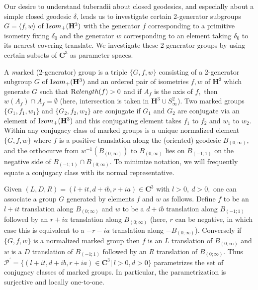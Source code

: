 
\begin{definition} \label{GMT 1.8}
Our desire to understand tuberadii about closed geodesics, and especially about a simple closed geodesic $\delta$, leads us to investigate certain 2-generator subgroups $G =
\langle f,w\rangle$  of ${\textrm Isom}_+(\mathbf {H}^3)$ with the generator $f$ corresponding to a primitive isometry fixing $\delta_0$ and the generator
$w$ corresponding to an element taking $\delta_0$ to its nearest covering translate.  We investigate these 2-generator groups by using certain
subsets of $\mathbf {C}^3$ as parameter spaces.

A {\textit marked {\textrm (2-}generator\/{\textrm )} group} is a triple $\{G,f,w\}$ consisting of a 2-generator subgroup $G$ of ${\textrm Isom}_+(\mathbf {H}^3)$
and an ordered pair of isometries $f,w$ of $\mathbf {H}^3$ which generate $G$  such that ${\textrm Relength}(f) > 0$ and if $A_f$ is the axis of $f,$ then $w(A_f)
\cap A_f  = \emptyset$  (here, intersection is taken in $\mathbf {H}^3 \cup S^2_\infty$). Two marked groups $\{G_1,f_1,w_1\}$ and $\{G_2,f_2,w_2\}$
are {\textit conjugate} if $G_1$ and $G_2$ are conjugate via an element of ${\textrm Isom}_+(\mathbf {H}^3)$ and this conjugating element takes $f_1$ to $f_2$
and
$w_1$ to $w_2.$  Within any conjugacy class of marked groups is a unique normalized element
$\{G,f,w\}$ where $f$ is a
positive translation  along the (oriented) geodesic $B_{(0;\infty)},$  and the
orthocurve from $w^{-1}(B_{(0;\infty)})$ to $B_{(0;\infty)}$ lies on 
$ B_{(-1;1)}$
on the negative side of $ B_{(-1;1)}\cap B_{(0;\infty)}.$  
To minimize notation, we will frequently equate a conjugacy class with its normal representative.
\end{definition}

Given $(L,D,R)=(l+it, d+ib, r+ia)\in\mathbf {C}^3$ with $l > 0,\ d > 0,$ one  can associate a group $G$ generated by  elements $f$ and $w$ as follows.  Define $f$ to be an $l+it$ translation along $B_{(0;\infty)}$ and $w$ to be a $d+ib$ translation along $ B_{(-1;1)}$ followed by an $r+ia$ translation along $B_{(0;\infty)}$ (here, $r$ can be negative, in which case this is equivalent to
a
$-r-ia$ translation along $-B_{(0;\infty)}$).  Conversely if $\{G,f,w\}$ is a normalized marked group then $f$ is an $L$ translation of $B_{(0;\infty)}$
and $w$ is a $D$ translation of 
$ B_{(-1;1)}$ followed by an $R$ translation of $B_{(0;\infty)}.$ Thus
$\mathcal {P}^\prime = \{(l+it,d+ib,r+ia)\in \mathbf {C}^3 | \ l>0, d>0\}$ 
parametrizes the
set of conjugacy classes of marked groups.  In particular, the parametrization is surjective and locally one-to-one.


